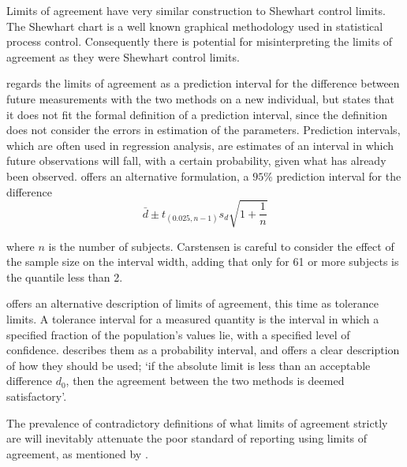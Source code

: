 \documentclass[12pt, a4paper]{report}
\theoremstyle{plain}
\theoremstyle{definition}
\theoremstyle{remark}
\begin{document}
	Limits of agreement have very similar construction to Shewhart
	control limits. The Shewhart chart is a well known graphical
	methodology used in statistical process control. Consequently
	there is potential for misinterpreting the limits of agreement as
	they were Shewhart control limits. 
	
	\citet{BXC2008} regards the limits of agreement as a prediction
	interval for the difference between future measurements with the
	two methods on a new individual, but states that it does not fit
	the formal definition of a prediction interval, since the
	definition does not consider the errors in estimation of the
	parameters. Prediction intervals, which are often used in
	regression analysis, are estimates of an interval in which future
	observations will fall, with a certain probability, given what has
	already been observed. \citet{BXC2008} offers an alternative
	formulation, a $95\%$ prediction interval for the difference
	\[
	\bar{d} \pm t_{(0.025, n-1)}s_{d} \sqrt{1+\frac{1}{n}}
	\]
	
	\noindent where $n$ is the number of subjects. Carstensen is
	careful to consider the effect of the sample size on the interval
	width, adding that only for 61 or more subjects is the
	quantile less than 2.
	
	\citet{luiz} offers an alternative description of limits of
	agreement, this time as tolerance limits. A tolerance interval for
	a measured quantity is the interval in which a specified fraction
	of the population's values lie, with a specified level of
	confidence. \citet{Barnhart} describes them as a probability
	interval, and offers a clear description of how they should be
	used; `if the absolute limit is less than an acceptable difference
	$d_{0}$, then the agreement between the two methods is deemed
	satisfactory'.
	
	The prevalence of contradictory definitions of what limits of agreement strictly are will inevitably attenuate the poor standard of reporting using limits of agreement, as mentioned by \citet{mantha}.
	
	
\end{document}
